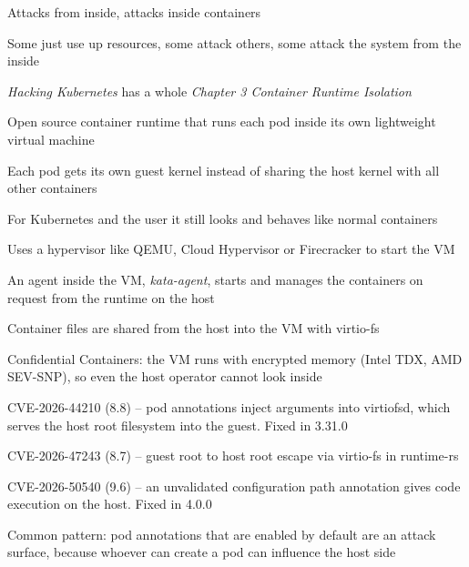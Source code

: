 \documentclass[Screen16to9,17pt]{foils}
\begin{document}
\begin{list2}
\item Attacks from inside, attacks inside containers
\item Some just use up resources, some attack others, some attack the system from the inside
\item \emph{Hacking Kubernetes} has a whole \emph{Chapter 3 Container Runtime Isolation}
\end{list2}


\begin{list1}
\item Open source container runtime that runs each pod inside its own lightweight virtual machine
\item Each pod gets its own guest kernel instead of sharing the host kernel with all other containers
\item For Kubernetes and the user it still looks and behaves like normal containers
\item Uses a hypervisor like QEMU, Cloud Hypervisor or Firecracker to start the VM
\item An agent inside the VM, \emph{kata-agent}, starts and manages the containers on request from the runtime on the host
\item Container files are shared from the host into the VM with virtio-fs
\item Confidential Containers: the VM runs with encrypted memory (Intel TDX, AMD SEV-SNP), so even the host operator cannot look inside
\end{list1}



\begin{list2}
\item CVE-2026-44210 (8.8) – pod annotations inject arguments into virtiofsd, which serves the host root filesystem into the guest. Fixed in 3.31.0
\item CVE-2026-47243 (8.7) – guest root to host root escape via virtio-fs in runtime-rs
\item CVE-2026-50540 (9.6) – an unvalidated configuration path annotation gives code execution on the host. Fixed in 4.0.0
\item Common pattern: pod annotations that are enabled by default are an attack surface, because whoever can create a pod can influence the host side
\end{list2}
\end{document}

